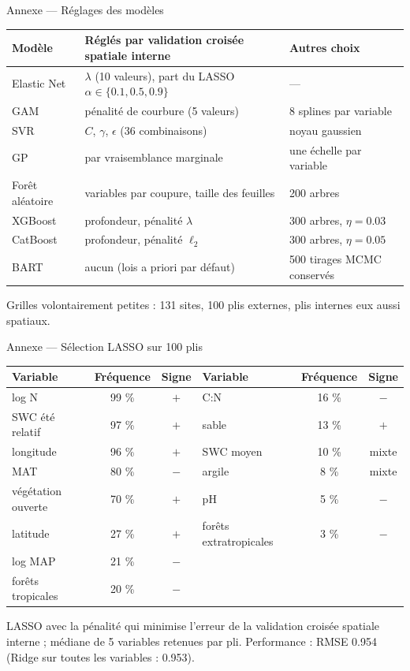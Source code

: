 \documentclass[aspectratio=169,10pt]{beamer}
\newcommand{\CN}{{\NoAutoSpacing C:N}}
\begin{document}
\begin{frame}{Annexe --- Réglages des modèles}
  \footnotesize
  \begin{tabular}{lll}
    \toprule
    Modèle & Réglés par validation croisée spatiale interne & Autres choix \\
    \midrule
    Elastic Net & $\lambda$ (10 valeurs), part du LASSO $\alpha\in\{0.1,0.5,0.9\}$ & --- \\
    GAM & pénalité de courbure (5 valeurs) & 8 splines par variable \\
    SVR & $C$, $\gamma$, $\epsilon$ (36 combinaisons) & noyau gaussien \\
    GP & par vraisemblance marginale & une échelle par variable \\
    Forêt aléatoire & variables par coupure, taille des feuilles & 200 arbres \\
    XGBoost & profondeur, pénalité $\lambda$ & 300 arbres, $\eta=0.03$ \\
    CatBoost & profondeur, pénalité $\ell_2$ & 300 arbres, $\eta=0.05$ \\
    BART & aucun (lois a priori par défaut) & 500 tirages MCMC conservés \\
    \bottomrule
  \end{tabular}
  \vspace{0.3cm}

  Grilles volontairement petites : 131 sites, 100 plis externes, plis internes eux aussi spatiaux.
\end{frame}

\begin{frame}{Annexe --- Sélection LASSO sur 100 plis}
  \small
  \begin{tabular}{lcc@{\hspace{1.2cm}}lcc}
    \toprule
    Variable & Fréquence & Signe & Variable & Fréquence & Signe \\
    \midrule
    log N & 99 \% & $+$ & \CN{} & 16 \% & $-$ \\
    SWC été relatif & 97 \% & $+$ & sable & 13 \% & $+$ \\
    longitude & 96 \% & $+$ & SWC moyen & 10 \% & mixte \\
    MAT & 80 \% & $-$ & argile & 8 \% & mixte \\
    végétation ouverte & 70 \% & $+$ & pH & 5 \% & $-$ \\
    latitude & 27 \% & $+$ & forêts extratropicales & 3 \% & $-$ \\
    log MAP & 21 \% & $-$ & & & \\
    forêts tropicales & 20 \% & $-$ & & & \\
    \bottomrule
  \end{tabular}
  \vspace{0.3cm}

  LASSO avec la pénalité qui minimise l'erreur de la validation croisée spatiale interne ; médiane de 5 variables retenues par pli. Performance : RMSE 0.954 (Ridge sur toutes les variables : 0.953).
\end{frame}
\end{document}
